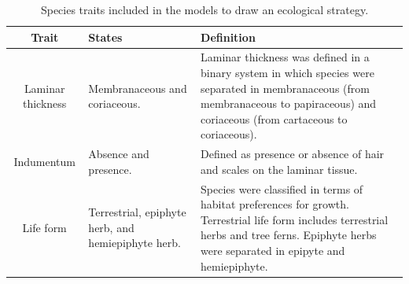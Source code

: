 \documentclass[12pt]{article}
\begin{document}

\begin{table}[!hb]
    \caption{ Species traits included in the models to draw an ecological strategy.}\label{trait}
  \begin{tabular}{cp{4cm}p{6cm}}
\hline
\bf{Trait}	&	\bf{States}	&	\bf{Definition} 	\\
\hline
Laminar thickness	&	Membranaceous and coriaceous.	&	Laminar thickness was defined in a binary system in which species were separated in membranaceous (from membranaceous to papiraceous) and coriaceous (from cartaceous to coriaceous).	 \\
Indumentum	&	Absence and presence.	&	Defined as presence or absence of hair and scales on the laminar tissue.  \\
Life form	&	Terrestrial, epiphyte herb, and hemiepiphyte herb.	&	Species were classified in terms of habitat preferences for growth. Terrestrial life form includes terrestrial herbs and tree ferns. Epiphyte herbs were separated in epipyte and hemiepiphyte. \\
\hline
\end{tabular}
\end{table}


\newpage
\end{document}
